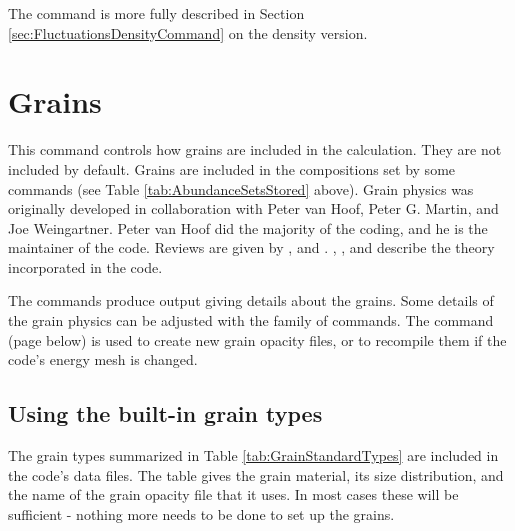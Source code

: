 The  command is more fully described in
Section \ref{sec:FluctuationsDensityCommand} on the density version.

\section{Grains}
\label{sec:GrainsCommand}

This command controls how grains are included in the calculation.
They are not included by default.
Grains are included in the compositions set
by some  commands
(see Table \ref{tab:AbundanceSetsStored} above).
Grain physics
was originally developed in collaboration with
Peter van Hoof, Peter G. Martin, and
Joe Weingartner. Peter van Hoof did the majority of the coding,
and he is the maintainer of the code.
Reviews are given by \citet{Spitzer1948,Spitzer1978}, and \citet{Martin1979}.
\citet{Baldwin1991},
\citet{Weingartner2001b}, \citet{VanHoof2004} and
\citet{Weingartner2006} describe the theory incorporated in the code.

The  commands produce
output giving details about the grains.
Some details of the grain physics
can be adjusted with the  family of commands.
The  command
(page \pageref{sec:CompileGrains} below) is used to 
create new grain opacity files, or to recompile them if
the code's energy mesh is changed.

\subsection{Using the built-in grain types}

The grain types summarized in Table \ref{tab:GrainStandardTypes} are
included in the code's data files.
The table gives the grain material, its size distribution,
and the name of the grain opacity file that it uses.
In most cases these
will be sufficient - nothing more needs to be done to set up the grains.

